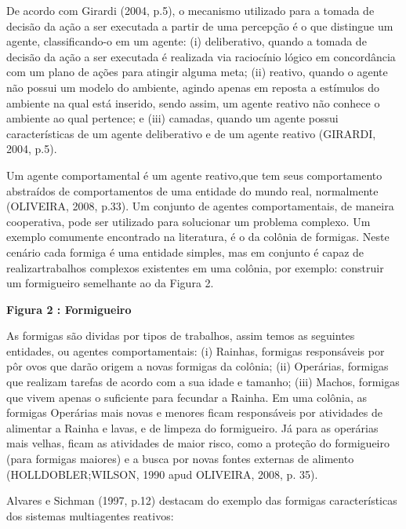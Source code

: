 De acordo com Girardi (2004, p.5), o mecanismo utilizado para a tomada de decisão da ação a ser executada a partir de uma percepção é o que distingue um agente, classificando-o em um agente: (i) deliberativo, quando a tomada de decisão da ação a ser executada é realizada via raciocínio lógico em concordância com um plano de ações para atingir alguma meta; (ii) reativo, quando o agente não possui um modelo do ambiente, agindo apenas em reposta a estímulos do ambiente na qual está inserido, sendo assim, um agente reativo não conhece o ambiente ao qual pertence; e (iii) camadas, quando um agente possui características de um agente deliberativo e de um agente reativo (GIRARDI, 2004, p.5). 


Um agente comportamental é um agente reativo,que tem seus comportamento abstraídos de comportamentos de uma entidade do mundo real, normalmente (OLIVEIRA, 2008, p.33). Um conjunto de agentes comportamentais, de maneira cooperativa, pode ser utilizado para solucionar um problema complexo. Um exemplo comumente encontrado na literatura, é o da colônia de formigas. Neste cenário cada formiga é uma entidade simples, mas em conjunto é capaz de realizartrabalhos complexos existentes em uma colônia, por exemplo: construir um formigueiro semelhante ao da Figura 2.

\textbf{Figura 2 : Formigueiro}

As formigas são dividas por tipos de trabalhos, assim temos as seguintes entidades, ou agentes comportamentais: (i) Rainhas, formigas responsáveis por pôr ovos que darão origem a novas formigas da colônia; (ii) Operárias, formigas que realizam tarefas de acordo com a sua idade e tamanho; (iii) Machos, formigas que vivem apenas o suficiente para fecundar a Rainha. Em uma colônia, as formigas Operárias mais novas e menores ficam responsáveis por atividades de alimentar a Rainha e lavas, e de limpeza do formigueiro. Já para as operárias mais velhas, ficam as atividades de maior risco, como a proteção do formigueiro (para formigas maiores) e a busca por novas fontes externas de alimento (HOLLDOBLER;WILSON, 1990 apud OLIVEIRA, 2008, p. 35).

Alvares e Sichman (1997, p.12) destacam do exemplo das formigas características dos sistemas multiagentes reativos:

